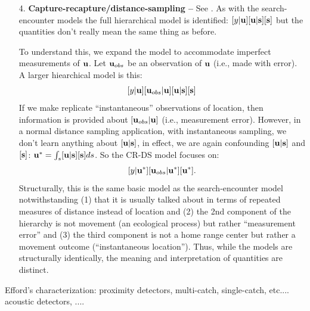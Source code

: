 \begin{itemize}
\item[4.] {\bf Capture-recapture/distance-sampling -- } See
  \citet{borchers_etal:1998}. As with the search-encounter models the
full hierarchical model is identified:
$[y|{\bf u}][{\bf u}|{\bf s}][{\bf s}]$ but the quantities don't
really mean the same thing as before.

To understand this, we expand the model to accommodate imperfect
measurements of ${\bf u}$. Let ${\bf u}_{obs}$ be an observation of
${\bf u}$ (i.e., made with error). A larger hiearchical model is this:
\[
[y|{\bf u}][{\bf u}_{obs}|{\bf u}][{\bf u}|{\bf s}][{\bf s}]
\]
If we make replicate ``instantaneous'' observations of location, then
information is provided about
 $[{\bf u}_{obs}|{\bf u}]$ (i.e., measurement error). However, in a normal
 distance sampling application, with instantaneous sampling, we don't
 learn anything about $[{\bf u}|{\bf s}]$,
in effect, we are again confounding $[{\bf u}|{\bf s}]$ and $[{\bf
  s}]$: ${\bf u}^{*} = \int_{s} [{\bf u}|{\bf s}][{\bf s}] ds$. So the CR-DS model focuses on:
\[
[y|{\bf u}^{*}][{\bf u}_{obs}|{\bf u}^{*}][{\bf u}^{*}].
\]
Structurally, this is the same basic model as the search-encounter
model notwithstanding (1) that it is usually talked about in terms of
repeated measures of distance instead of location and (2) the 2nd
component of the hierarchy is not movement (an ecological process) but
rather ``measurement error'' and (3) the third component is not a home
range center but rather a movement outcome (``instantaneous
location'').  Thus, while the models are structurally identically, the
meaning and interpretation of quantities are distinct.

\end{itemize}

Efford's characterization:
proximity detectors, multi-catch, single-catch, etc....
acoustic detectors, ....

